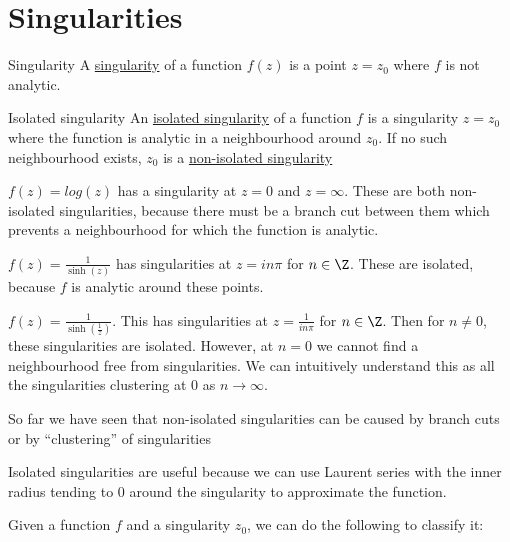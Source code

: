 \documentclass[../Main.tex]{subfiles}
\begin{document}
\section{Singularities}
\begin{definition}{Singularity}
    A \underline{singularity} of a function $f(z)$ is a point $z = z_0$ where $f$ is not analytic.
\end{definition}
\begin{definition}{Isolated singularity}
    An \underline{isolated singularity} of a function $f$ is a singularity $z = z_0$ where the function is analytic in a neighbourhood around $z_0$. If no such neighbourhood exists, $z_0$ is a \underline{non-isolated singularity}
\end{definition}
\begin{examples}{}
    \item $f(z) = log(z)$ has a singularity at $z = 0$ and $z = \infty$. These are both non-isolated singularities, because there must be a branch cut between them which prevents a neighbourhood for which the function is analytic.
    \item $f(z) = \frac{1}{\sinh(z)}$ has singularities at $z = in\pi$ for $n \in \Z$. These are isolated, because $f$ is analytic around these points.
    \item $f(z) = \frac{1}{\sinh\left(\frac{1}{z}\right)}$. This has singularities at $z = \frac{1}{in\pi}$ for $n \in \Z$. Then for $n \neq 0$, these singularities are isolated. However, at $n = 0$ we cannot find a neighbourhood free from singularities. We can intuitively understand this as all the singularities clustering at $0$ as $n \to \infty$.
\end{examples}
\begin{remarks}
    \item So far we have seen that non-isolated singularities can be caused by branch cuts or by ``clustering'' of singularities
    \item Isolated singularities are useful because we can use Laurent series with the inner radius tending to $0$ around the singularity to approximate the function.
\end{remarks}
Given a function $f$ and a singularity $z_0$, we can do the following to classify it:
\end{document}

